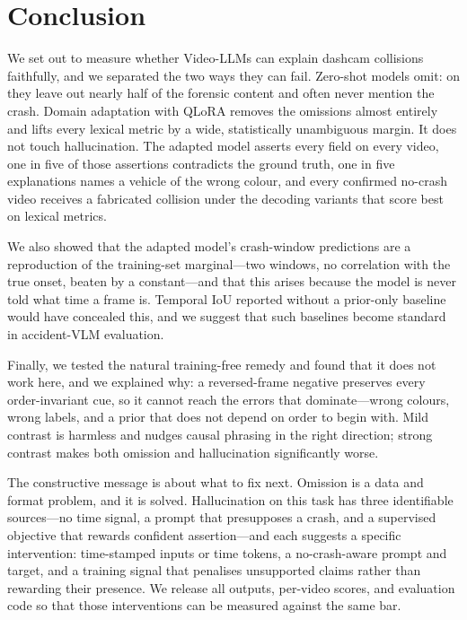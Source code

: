 \section{Conclusion}
\label{sec:conclusion}

We set out to measure whether Video-LLMs can explain dashcam collisions faithfully, and we separated the two ways they can fail.
Zero-shot models omit: on \dataset{} they leave out nearly half of the forensic content and often never mention the crash.
Domain adaptation with QLoRA removes the omissions almost entirely and lifts every lexical metric by a wide, statistically unambiguous margin.
It does not touch hallucination.
The adapted model asserts every field on every video, one in five of those assertions contradicts the ground truth, one in five explanations names a vehicle of the wrong colour, and every confirmed no-crash video receives a fabricated collision under the decoding variants that score best on lexical metrics.

We also showed that the adapted model's crash-window predictions are a reproduction of the training-set marginal---two windows, no correlation with the true onset, beaten by a constant---and that this arises because the model is never told what time a frame is.
Temporal IoU reported without a prior-only baseline would have concealed this, and we suggest that such baselines become standard in accident-VLM evaluation.

Finally, we tested the natural training-free remedy and found that it does not work here, and we explained why: a reversed-frame negative preserves every order-invariant cue, so it cannot reach the errors that dominate---wrong colours, wrong labels, and a prior that does not depend on order to begin with.
Mild contrast is harmless and nudges causal phrasing in the right direction; strong contrast makes both omission and hallucination significantly worse.

The constructive message is about what to fix next.
Omission is a data and format problem, and it is solved.
Hallucination on this task has three identifiable sources---no time signal, a prompt that presupposes a crash, and a supervised objective that rewards confident assertion---and each suggests a specific intervention: time-stamped inputs or time tokens, a no-crash-aware prompt and target, and a training signal that penalises unsupported claims rather than rewarding their presence.
We release all outputs, per-video scores, and evaluation code so that those interventions can be measured against the same bar.

